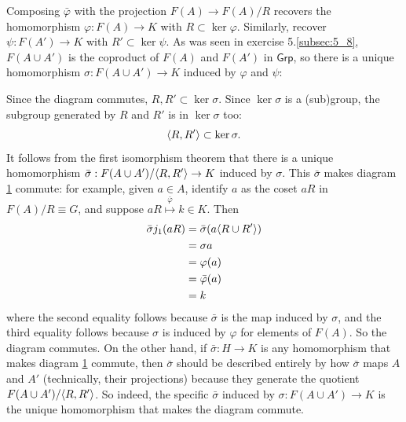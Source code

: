 \documentclass[12pt]{article}
\begin{document}
\begin{figure}[h]
  \centering
  \captionsetup{labelsep=period}
  \renewcommand{\figurename}{Diagram}
  \caption{} \label{fig:8_8_up}
\end{figure}
Composing $\bar{\varphi}$ with the projection $F(A) \rightarrow F(A) / R$ recovers the homomorphism $\varphi: F(A) \rightarrow K$ with $R \subset \ker \varphi$.   
Similarly, recover $\psi:F(A') \rightarrow K$ with $R' \subset \ker \psi$. 
As was seen in exercise 5.\ref{subsec:5_8}, $F(A \cup A')$ is the coproduct of $F(A)$ and $F(A')$ in $\mathsf{Grp}$, so there is a unique homomorphism $\sigma: F(A \cup A') \rightarrow K$ induced by $\varphi$ and $\psi$: 
\begin{center}
\end{center}
Since the diagram commutes, $R, R' \subset \ker \sigma$. 
Since $\ker \sigma$ is a (sub)group, the subgroup generated by $R$ and $R'$ is in $\ker \sigma$ too: 
$$\langle R, R'\rangle \subset \ker \sigma.$$
It follows from the first isomorphism theorem that there is a unique homomorphism $\bar{\sigma}: F(A \cup A') / \langle R, R'\rangle \rightarrow K$ induced by $\sigma$. 
This $\bar{\sigma}$ makes diagram \ref{fig:8_8_up} commute: 
for example, given $a \in A$, identify $a$ as the coset $aR$ in  $F(A) / R \equiv G$, and suppose $aR \overset{\bar{\varphi}}{\mapsto} k \in K$. 
Then 
\begin{align*}
  \bar{\sigma} j_1(aR) & = \bar{\sigma}(a\langle R \cup R'\rangle) \\ 
                       & = \sigma{a} \\ 
                       & = \varphi(a) \\ 
                       & = \bar{\varphi}(a) \\ 
                       & = k
\end{align*}
where the second equality follows because $\bar{\sigma}$ is the map induced by $\sigma$, and the third equality follows because $\sigma$ is induced by $\varphi$ for elements of $F(A)$. 
So the diagram commutes. 
On the other hand, if $\bar{\sigma}: H \rightarrow K$ is any homomorphism that makes diagram \ref{fig:8_8_up} commute, then $\bar{\sigma}$ should be described entirely by how $\bar{\sigma}$ maps $A$ and $A'$ (technically, their projections) because they generate the quotient $F(A \cup A') / \langle R, R'\rangle$. 
So indeed, the specific $\bar{\sigma}$ induced by $\sigma: F(A \cup A') \rightarrow K$ is the unique homomorphism that makes the diagram commute. 
\end{document}
